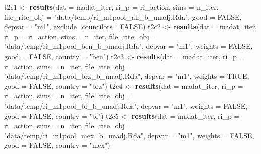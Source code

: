 \documentclass[]{article}
\newenvironment{Shaded}{\begin{snugshade}}{\end{snugshade}}
\newcommand{\KeywordTok}[1]{\textcolor[rgb]{0.13,0.29,0.53}{\textbf{#1}}}
\newcommand{\DataTypeTok}[1]{\textcolor[rgb]{0.13,0.29,0.53}{#1}}
\newcommand{\StringTok}[1]{\textcolor[rgb]{0.31,0.60,0.02}{#1}}
\newcommand{\OtherTok}[1]{\textcolor[rgb]{0.56,0.35,0.01}{#1}}
\newcommand{\NormalTok}[1]{#1}
\begin{document}
\begin{Shaded}
\begin{Highlighting}[]
\NormalTok{   t2c1 <-}\StringTok{  }\KeywordTok{results}\NormalTok{(}\DataTypeTok{dat =}\NormalTok{ madat_iter, }\DataTypeTok{ri_p =}\NormalTok{ ri_action, }\DataTypeTok{sims =}\NormalTok{ n_iter,}
                  \DataTypeTok{file_rite_obj =} \StringTok{"data/temp/ri_m1pool_all_b_unadj.Rda"}\NormalTok{,}
                  \DataTypeTok{good =} \OtherTok{FALSE}\NormalTok{, }\DataTypeTok{depvar =} \StringTok{"m1"}\NormalTok{, }\DataTypeTok{exclude_councilors =}\OtherTok{FALSE}\NormalTok{)}
\NormalTok{  t2c2 <-}\StringTok{ }\KeywordTok{results}\NormalTok{(}\DataTypeTok{dat =}\NormalTok{ madat_iter, }\DataTypeTok{ri_p =}\NormalTok{ ri_action, }\DataTypeTok{sims =}\NormalTok{ n_iter,}
                  \DataTypeTok{file_rite_obj =} \StringTok{"data/temp/ri_m1pool_ben_b_unadj.Rda"}\NormalTok{,}
                  \DataTypeTok{depvar =} \StringTok{"m1"}\NormalTok{, }\DataTypeTok{weights =} \OtherTok{FALSE}\NormalTok{, }\DataTypeTok{good =} \OtherTok{FALSE}\NormalTok{, }\DataTypeTok{country =} \StringTok{"ben"}\NormalTok{)}
\NormalTok{  t2c3 <-}\StringTok{ }\KeywordTok{results}\NormalTok{(}\DataTypeTok{dat =}\NormalTok{ madat_iter, }\DataTypeTok{ri_p =}\NormalTok{ ri_action, }\DataTypeTok{sims =}\NormalTok{ n_iter,}
                  \DataTypeTok{file_rite_obj =} \StringTok{"data/temp/ri_m1pool_brz_b_unadj.Rda"}\NormalTok{,}
                  \DataTypeTok{depvar =} \StringTok{"m1"}\NormalTok{, }\DataTypeTok{weights =} \OtherTok{TRUE}\NormalTok{,  }\DataTypeTok{good =} \OtherTok{FALSE}\NormalTok{, }\DataTypeTok{country =} \StringTok{"brz"}\NormalTok{)}
\NormalTok{  t2c4 <-}\StringTok{ }\KeywordTok{results}\NormalTok{(}\DataTypeTok{dat =}\NormalTok{ madat_iter, }\DataTypeTok{ri_p =}\NormalTok{ ri_action, }\DataTypeTok{sims =}\NormalTok{ n_iter,}
                  \DataTypeTok{file_rite_obj =} \StringTok{"data/temp/ri_m1pool_bf_b_unadj.Rda"}\NormalTok{,}
                  \DataTypeTok{depvar =} \StringTok{"m1"}\NormalTok{, }\DataTypeTok{weights =} \OtherTok{FALSE}\NormalTok{, }\DataTypeTok{good =} \OtherTok{FALSE}\NormalTok{, }\DataTypeTok{country =} \StringTok{"bf"}\NormalTok{)}
\NormalTok{  t2c5 <-}\StringTok{ }\KeywordTok{results}\NormalTok{(}\DataTypeTok{dat =}\NormalTok{ madat_iter, }\DataTypeTok{ri_p =}\NormalTok{ ri_action, }\DataTypeTok{sims =}\NormalTok{ n_iter,}
                  \DataTypeTok{file_rite_obj =} \StringTok{"data/temp/ri_m1pool_mex_b_unadj.Rda"}\NormalTok{,}
                  \DataTypeTok{depvar =} \StringTok{"m1"}\NormalTok{, }\DataTypeTok{weights =} \OtherTok{FALSE}\NormalTok{, }\DataTypeTok{good =} \OtherTok{FALSE}\NormalTok{, }\DataTypeTok{country =} \StringTok{"mex"}\NormalTok{)}

\end{Highlighting}
\end{Shaded}
\end{document}

